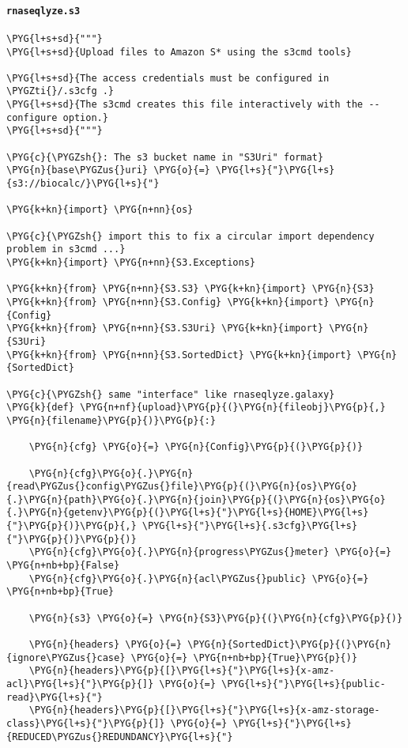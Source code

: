 \paragraph{\texttt{rnaseqlyze.s3}}
\label{index-pdf4:rnaseqlyze-s3}
\begin{Verbatim}[commandchars=\\\{\}]
\PYG{l+s+sd}{"""}
\PYG{l+s+sd}{Upload files to Amazon S* using the s3cmd tools}

\PYG{l+s+sd}{The access credentials must be configured in \PYGZti{}/.s3cfg .}
\PYG{l+s+sd}{The s3cmd creates this file interactively with the --configure option.}
\PYG{l+s+sd}{"""}

\PYG{c}{\PYGZsh{}: The s3 bucket name in "S3Uri" format}
\PYG{n}{base\PYGZus{}uri} \PYG{o}{=} \PYG{l+s}{"}\PYG{l+s}{s3://biocalc/}\PYG{l+s}{"}

\PYG{k+kn}{import} \PYG{n+nn}{os}

\PYG{c}{\PYGZsh{} import this to fix a circular import dependency problem in s3cmd ...}
\PYG{k+kn}{import} \PYG{n+nn}{S3.Exceptions}

\PYG{k+kn}{from} \PYG{n+nn}{S3.S3} \PYG{k+kn}{import} \PYG{n}{S3}
\PYG{k+kn}{from} \PYG{n+nn}{S3.Config} \PYG{k+kn}{import} \PYG{n}{Config}
\PYG{k+kn}{from} \PYG{n+nn}{S3.S3Uri} \PYG{k+kn}{import} \PYG{n}{S3Uri}
\PYG{k+kn}{from} \PYG{n+nn}{S3.SortedDict} \PYG{k+kn}{import} \PYG{n}{SortedDict}

\PYG{c}{\PYGZsh{} same "interface" like rnaseqlyze.galaxy}
\PYG{k}{def} \PYG{n+nf}{upload}\PYG{p}{(}\PYG{n}{fileobj}\PYG{p}{,} \PYG{n}{filename}\PYG{p}{)}\PYG{p}{:}

    \PYG{n}{cfg} \PYG{o}{=} \PYG{n}{Config}\PYG{p}{(}\PYG{p}{)}

    \PYG{n}{cfg}\PYG{o}{.}\PYG{n}{read\PYGZus{}config\PYGZus{}file}\PYG{p}{(}\PYG{n}{os}\PYG{o}{.}\PYG{n}{path}\PYG{o}{.}\PYG{n}{join}\PYG{p}{(}\PYG{n}{os}\PYG{o}{.}\PYG{n}{getenv}\PYG{p}{(}\PYG{l+s}{"}\PYG{l+s}{HOME}\PYG{l+s}{"}\PYG{p}{)}\PYG{p}{,} \PYG{l+s}{"}\PYG{l+s}{.s3cfg}\PYG{l+s}{"}\PYG{p}{)}\PYG{p}{)}
    \PYG{n}{cfg}\PYG{o}{.}\PYG{n}{progress\PYGZus{}meter} \PYG{o}{=} \PYG{n+nb+bp}{False}
    \PYG{n}{cfg}\PYG{o}{.}\PYG{n}{acl\PYGZus{}public} \PYG{o}{=} \PYG{n+nb+bp}{True}

    \PYG{n}{s3} \PYG{o}{=} \PYG{n}{S3}\PYG{p}{(}\PYG{n}{cfg}\PYG{p}{)}

    \PYG{n}{headers} \PYG{o}{=} \PYG{n}{SortedDict}\PYG{p}{(}\PYG{n}{ignore\PYGZus{}case} \PYG{o}{=} \PYG{n+nb+bp}{True}\PYG{p}{)}
    \PYG{n}{headers}\PYG{p}{[}\PYG{l+s}{"}\PYG{l+s}{x-amz-acl}\PYG{l+s}{"}\PYG{p}{]} \PYG{o}{=} \PYG{l+s}{"}\PYG{l+s}{public-read}\PYG{l+s}{"}
    \PYG{n}{headers}\PYG{p}{[}\PYG{l+s}{"}\PYG{l+s}{x-amz-storage-class}\PYG{l+s}{"}\PYG{p}{]} \PYG{o}{=} \PYG{l+s}{"}\PYG{l+s}{REDUCED\PYGZus{}REDUNDANCY}\PYG{l+s}{"}


\end{Verbatim}
